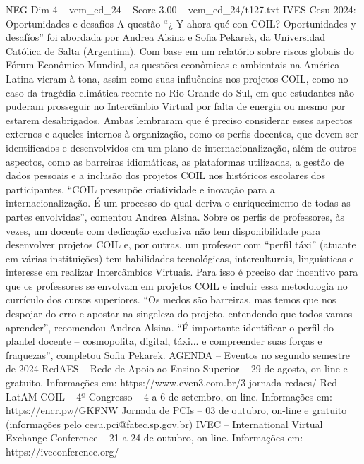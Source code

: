 \begin{textsample}{NEG Dim 4 – vem\_ed\_24 – Score 3.00 – vem\_ed\_24/t127.txt}  \label{ex:f4_neg_066}
IVES Cesu 2024: Oportunidades e desafios A questão “¿ Y ahora qué con COIL?
Oportunidades y desafíos” foi abordada por Andrea Alsina e Sofia Pekarek, da Universidad Católica de Salta (Argentina).
Com base em um relatório sobre riscos globais do Fórum Econômico Mundial, as questões econômicas e ambientais na América Latina vieram à tona, assim como suas influências nos projetos COIL, como no caso da tragédia climática recente no Rio Grande do Sul, em que estudantes não puderam prosseguir no Intercâmbio Virtual por falta de energia ou mesmo por estarem desabrigados.
Ambas lembraram que é preciso considerar esses aspectos externos e aqueles internos à organização, como os perfis docentes, que devem ser identificados e desenvolvidos em um plano de internacionalização, além de outros aspectos, como as barreiras idiomáticas, as plataformas utilizadas, a gestão de dados pessoais e a inclusão dos projetos COIL nos históricos escolares dos participantes. “COIL pressupõe criatividade e inovação para a internacionalização.
É um processo do qual deriva o enriquecimento de todas as partes envolvidas”, comentou Andrea Alsina.
Sobre os perfis de professores, às vezes, um docente com dedicação exclusiva não tem disponibilidade para desenvolver projetos COIL e, por outras, um professor com “perfil táxi” (atuante em várias instituições) tem habilidades tecnológicas, interculturais, linguísticas e interesse em realizar Intercâmbios Virtuais.
Para isso é preciso dar incentivo para que os professores se envolvam em projetos COIL e incluir essa metodologia no currículo dos cursos superiores. “Os medos são barreiras, mas temos que nos despojar do erro e apostar na singeleza do projeto, entendendo que todos vamos aprender”, recomendou Andrea Alsina. “É importante identificar o perfil do plantel docente – cosmopolita, digital, táxi... e compreender suas forças e fraquezas”, completou Sofia Pekarek.
AGENDA – Eventos no segundo semestre de 2024 RedAES – Rede de Apoio ao Ensino Superior – 29 de agosto, on-line e gratuito.
Informações em: https://www.even3.com.br/3-jornada-redaes/ Red LatAM COIL – 4º Congresso – 4 a 6 de setembro, on-line.
Informações em: https://encr.pw/GKFNW Jornada de PCIs – 03 de outubro, on-line e gratuito (informações pelo cesu.pci@fatec.sp.gov.br) IVEC – International Virtual Exchange Conference – 21 a 24 de outubro, on-line.
Informações em: https://iveconference.org/

\end{textsample}
